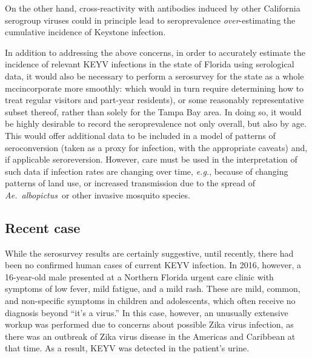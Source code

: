 \documentclass[12pt]{article}
\newcommand{\alb}{\textit{Ae.\ albopictus}}
\newcommand{\eg}{\textit{e.g.}}
\newcommand{\cjh}{\textcolor{blue}{cjh}}
\newcommand{\msg}[3]{(#1 $\rightarrow$ #2: #3)}
\newcommand{\mcc}[1]{\msg\cjh\cjh{#1}}
\begin{document}
        On the other hand, cross-reactivity with antibodies induced by other California serogroup viruses could in principle lead to seroprevalence \textit{over}-estimating the cumulative incidence of Keystone infection.

        In addition to addressing the above concerns, in order to accurately estimate the incidence of relevant KEYV infections in the state of Florida using serological data, it would also be necessary to perform a serosurvey for the state as a whole mcc{incorporate more smoothly: which would in turn require determining how to treat regular visitors and part-year residents}), or some reasonably representative subset thereof, rather than solely for the Tampa Bay area. In doing so, it would be highly desirable to record the seroprevalence not only overall, but also by age. This would offer additional data to be included in a model of patterns of seroconversion (taken as a proxy for infection, with the appropriate caveats) and, if applicable seroreversion. However, care must be used in the interpretation of such data if infection rates are changing over time, \eg, because of changing patterns of land use, or increased transmission due to the spread of \alb\ or other invasive mosquito species.


        \subsection{Recent case}
            \label{recent-case}
            While the serosurvey results are certainly suggestive, until recently, there had been no confirmed human cases of current KEYV infection. In 2016, however, a 16-year-old male presented at a Northern Florida urgent care clinic with symptoms of low fever, mild fatigue, and a mild rash. These are mild, common, and non-specific symptoms in children and adolescents, which often receive no diagnosis beyond ``it's a virus.'' In this case, however, an unusually extensive workup was performed due to concerns about possible Zika virus infection, as there was an outbreak of Zika virus disease in the Americas and Caribbean at that time. As a result, KEYV was detected in the patient's urine.\cite{lednicky2018keystone}
        
\end{document}

